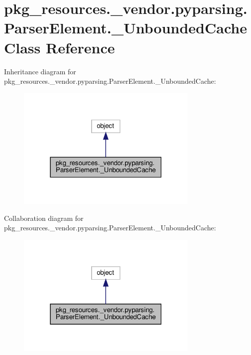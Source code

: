 \hypertarget{classpkg__resources_1_1__vendor_1_1pyparsing_1_1ParserElement_1_1__UnboundedCache}{}\section{pkg\+\_\+resources.\+\_\+vendor.\+pyparsing.\+Parser\+Element.\+\_\+\+Unbounded\+Cache Class Reference}
\label{classpkg__resources_1_1__vendor_1_1pyparsing_1_1ParserElement_1_1__UnboundedCache}


Inheritance diagram for pkg\+\_\+resources.\+\_\+vendor.\+pyparsing.\+Parser\+Element.\+\_\+\+Unbounded\+Cache\+:
\nopagebreak
\begin{figure}[H]
\begin{center}
\leavevmode
\includegraphics[width=247pt]{classpkg__resources_1_1__vendor_1_1pyparsing_1_1ParserElement_1_1__UnboundedCache__inherit__graph}
\end{center}
\end{figure}


Collaboration diagram for pkg\+\_\+resources.\+\_\+vendor.\+pyparsing.\+Parser\+Element.\+\_\+\+Unbounded\+Cache\+:
\nopagebreak
\begin{figure}[H]
\begin{center}
\leavevmode
\includegraphics[width=247pt]{classpkg__resources_1_1__vendor_1_1pyparsing_1_1ParserElement_1_1__UnboundedCache__coll__graph}
\end{center}
\end{figure}
